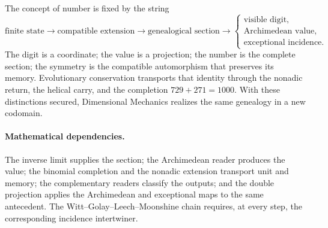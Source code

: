 The concept of number is fixed by the string
\[
 \boxed{
 \text{finite state}
 \longrightarrow\text{compatible extension}
 \longrightarrow\text{genealogical section}
 \longrightarrow
 \begin{cases}
   \text{visible digit},\\
   \text{Archimedean value},\\
   \text{exceptional incidence}.
 \end{cases}}
\]
The digit is a coordinate; the value is a projection; the number is the
complete section; the symmetry is the compatible automorphism that preserves its
memory. Evolutionary conservation transports that identity through the
nonadic return, the helical carry, and the completion
\(729+271=1000\). With these distinctions secured, Dimensional Mechanics
realizes the same genealogy in a new codomain.

\paragraph{Mathematical dependencies.}
The inverse limit supplies the section; the Archimedean reader produces the
value; the binomial completion and the nonadic extension transport unit and
memory; the complementary readers classify the outputs; and the double
projection applies the Archimedean and exceptional maps to the same antecedent.
The Witt--Golay--Leech--Moonshine chain requires, at every step, the
corresponding incidence intertwiner.
